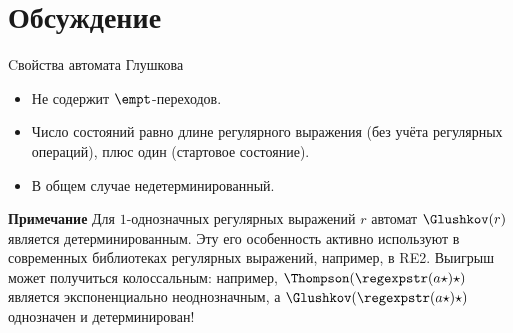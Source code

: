 \section{Обсуждение}
\begin{frame}{Cвойства автомата Глушкова}
  \begin{itemize}
    \item Не содержит $\empt$-переходов.
    \item Число состояний равно длине регулярного выражения (без учёта регулярных операций), плюс один (стартовое состояние).
    \item В общем случае недетерминированный.
  \end{itemize}

  \begin{alertblock}{\bf Примечание}
    Для $1$-однозначных регулярных выражений $r$ автомат $\Glushkov(r)$ является детерминированным. Эту его особенность активно используют в современных библиотеках регулярных выражений, например, в \textsc{RE2}. Выигрыш может получиться колоссальным: например, $\Thompson(\regexpstr(a\star)\star)$ является экспоненциально неоднозначным, а $\Glushkov(\regexpstr(a\star)\star)$ однозначен и детерминирован!
  \end{alertblock}%
\end{frame}

